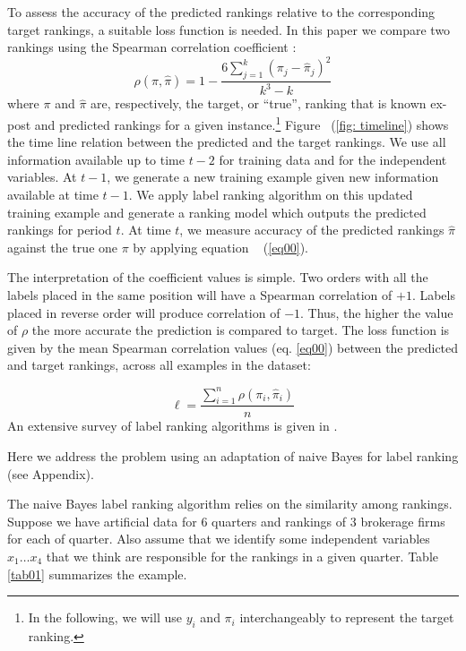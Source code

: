 \documentclass{article}\usepackage[]{graphicx}\usepackage[]{color}
\begin{document}
To assess the accuracy of the predicted rankings relative to the corresponding target rankings, a suitable loss function is needed. In this paper we compare two rankings using the Spearman correlation coefficient \cite{brazdil2003,vembu2009}:
\begin{equation}
\label{eq00}
 \rho(\pi,\hat{\pi})=1-\frac{6\sum_{j=1}^k(\pi_j-\hat{\pi}_j)^2}{k^3-k}
\end{equation}
where $\pi$ and $\hat{\pi}$ are, respectively, the target, or ``true'', ranking that is known ex-post  and predicted rankings for a given instance.\footnote{ In the following, we will use $y_i$ and $\pi_i$ interchangeably to represent the target ranking.} Figure ~(\ref{fig: timeline}) shows the time line relation between the predicted and the target rankings. We use all information available up to time $t-2$ for training data and for the independent variables. At $t-1$, we generate a new training example given new information available at time $t-1$. We apply label ranking algorithm on this updated training example and generate a ranking model which outputs the predicted rankings for period $t$. At time $t$, we measure accuracy of the predicted rankings $\hat{\pi}$ against the true one $\pi$ by applying equation ~ (\ref{eq00}).

The interpretation of the coefficient values is simple. Two orders with all the labels placed in the same position will have a Spearman correlation of $+1$. Labels placed in reverse order will produce  correlation of $-1$. Thus, the higher the value of $\rho$ the more accurate the prediction is compared to target. The loss function is given by the mean Spearman correlation values (eq. \ref{eq00}) between the predicted and target rankings, across all examples in the dataset:


\begin{equation}
\label{loss}
 \ell=\frac{\sum_{i=1}^n \rho(\pi_i,\hat{\pi}_i)}{n}
\end{equation}
An extensive survey of label ranking algorithms is given in \cite{vembu2009}.


Here we address the problem using an adaptation of naive Bayes for label ranking \citep{aiguzhinov2010} (see Appendix). 

The naive Bayes label ranking algorithm relies on the similarity  among rankings. Suppose we have  artificial data for 6 quarters and rankings of 3 brokerage firms  for each of  quarter. Also assume that we identify some independent variables $x_1 \ldots x_4$ that we think are responsible for the rankings in a given quarter. Table \ref{tab01} summarizes the example. 
\end{document}
